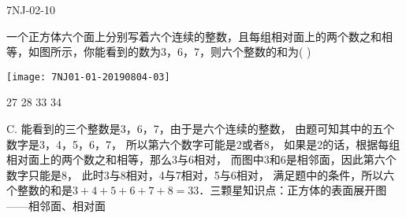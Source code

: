 \begin{defproblem}{7NJ-02-10}%
\begin{onlyproblem}%
一个正方体六个面上分别写着六个连续的整数，且每组相对面上的两个数之和相等，如图所示，你能看到的数为3，6，7，则六个整数的和为(    ) 
\begin{center}
\texttt{[image: 7NJ01-01-20190804-03]}
\end{center}

\xx
{27}
{28}
{33}
{34}

\end{onlyproblem}%
\begin{onlysolution}%
\begin{solution}%
C. 
能看到的三个整数是3，6，7，由于是六个连续的整数， 由题可知其中的五个数字是3，4，5，6，7， 所以第六个数字可能是2或者8， 如果是2的话，根据每组相对面上的两个数之和相等，那么3与6相对， 而图中3和6是相邻面，因此第六个数字只能是8， 此时3与8相对，4与7相对，5与6相对， 满足题中的条件，所以六个整数的和是$3+4+5+6+7+8=33$．三颗星知识点：正方体的表面展开图——相邻面、相对面
\end{solution}%
\end{onlysolution}%
\end{defproblem}







